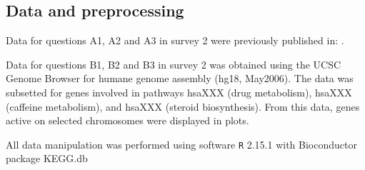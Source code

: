 \subsection*{Data and preprocessing}
Data for questions A1, A2 and A3 in survey 2 were previously published in: \citep{dawson:1995}.

Data for questions B1, B2 and B3 in survey 2 was obtained using the UCSC Genome Browser \cite{ucsc:2002} for humane genome assembly (hg18, May2006). The data was subsetted for genes involved in pathways hsaXXX (drug metabolism), hsaXXX (caffeine metabolism), and hsaXXX (steroid biosynthesis). From this data, genes active on selected chromosomes were displayed in plots.

All data manipulation was performed  using software {\tt R} 2.15.1 \citep{R} with Bioconductor package KEGG.db \cite{kegg}
%
%



